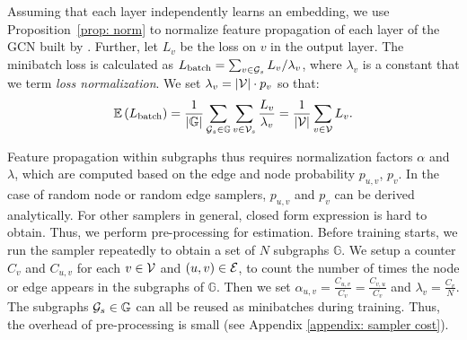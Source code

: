 Assuming that each layer independently learns an embedding, we use Proposition~\ref{prop: norm} to normalize feature propagation of each layer of the GCN built by \graphsaint.
Further, let $L_v$ be the loss on $v$ in the output layer. The minibatch loss is calculated as $L_{\text{batch}} = \sum_{v \in \G[s]} L_v/\lambda_v$, where $\lambda_v$ is a constant that we term \emph{loss normalization}. We set $\lambda_v = \size{\V}\cdot p_v$ so that:
\begin{equation}
    \mathbb{E}\paren{L_{\text{batch}}} = \frac{1}{\size{\mathbb{G}}}\sum_{\G[s]\in\mathbb{G}}\sum_{v\in\V[s]} \frac{L_v}{\lambda_v} = \frac{1}{\size{\V}}\sum_{v\in\V} L_v.
\end{equation}

Feature propagation within subgraphs thus requires normalization factors $\alpha$ and $\lambda$, which are computed based on the edge and node probability $p_{u,v}$, $p_v$. 
In the case of random node or random edge samplers, $p_{u,v}$ and $p_v$ can be derived analytically. For other samplers in general, closed form expression is hard to obtain. Thus, we perform pre-processing for estimation. 
Before training starts, we run the sampler repeatedly to obtain a set of $N$ subgraphs $\mathbb{G}$. We setup a counter $C_v$ and $C_{u,v}$ for each $v\in\V$ and $\paren{u,v}\in\E$, to count the number of times the node or edge appears in the subgraphs of $\mathbb{G}$. 
Then we set $\alpha_{u,v}=\frac{C_{u,v}}{C_v}=\frac{C_{v,u}}{C_v}$ and $\lambda_v=\frac{C_v}{N}$.
The subgraphs $\G[s]\in\mathbb{G}$ can all be reused as minibatches during training. Thus, the overhead of pre-processing is small (see Appendix \ref{appendix: sampler cost}). 





